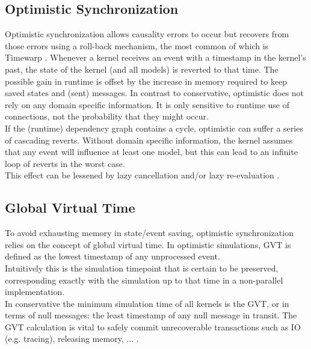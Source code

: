 \subsection{Optimistic Synchronization}
Optimistic synchronization allows causality errors to occur but recovers from those errors using a roll-back mechanism, the most common of which is Timewarp \cite{Jefferson:1985:VT:3916.3988}.
Whenever a kernel receives an event with a timestamp in the kernel's past, the state of the kernel (and all models) is reverted to that time. The possible gain in runtime is offset by the increase in memory required to keep saved states and (sent) messages.
In contrast to conservative, optimistic does not rely on any domain specific information. It is only sensitive to runtime use of connections, not the probability that they might occur. %
\\
If the (runtime) dependency graph contains a cycle, optimistic can suffer a series of cascading reverts. Without domain specific information, the kernel assumes that any event will influence at least one model, but this can lead to an infinite loop of reverts in the worst case.\\
This effect can be lessened by lazy cancellation and/or lazy re-evaluation \cite{FujimotoBook}.
\subsection{Global Virtual Time}
To avoid exhausting memory in state/event saving, optimistic synchronization relies on the concept of global virtual time\cite{Jefferson:1985:VT:3916.3988}. In optimistic simulations, GVT is defined as the lowest timestamp of any unprocessed event. \\ Intuitively this is the simulation timepoint that is certain to be preserved, corresponding exactly with the simulation up to that time in a non-parallel implementation.\\
In conservative the minimum simulation time of all kernels is the GVT, or in terms of null messages: the least timestamp of any null message in transit.
The GVT calculation is vital to safely commit unrecoverable transactions such as IO (e.g. tracing), releasing memory, ... .

